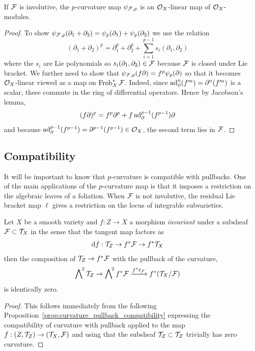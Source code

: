 \documentclass[main.tex]{subfiles}
\begin{document}
\begin{lemma}
If $\mathcal{F}$ is involutive, the $p$-curvature map $\psi_{\mathcal{F},p}$ is an $\mathcal{O}_X$-linear map of $\mathcal{O}_X$-modules.
\end{lemma}

\begin{proof}
To show $\psi_{\mathcal{F},p}(\partial_1 + \partial_2) = \psi_p(\partial_1) + \psi_p(\partial_2)$ we use the relation
\[ (\partial_1 + \partial_2)^p = \partial_1^p + \partial_2^p + \sum_{i = 1}^{p-1} s_i(\partial_1, \partial_2) \]
where the $s_i$ are Lie polynomials so $s_i(\partial_1, \partial_2) \in \mathcal{F}$ because $\mathcal{F}$ is closed under Lie bracket.
We further need to show that $\psi_{\mathcal{F},p}(f \partial) = f^p \psi_p(\partial)$ so that it becomes $\mathcal{O}_X$-linear viewed as a map on $\operatorname{\mathrm{Frob}}_X^* \mathcal{F}$. Indeed, since $\operatorname{\mathrm{ad}}_{\partial}^n(f^m) = \partial^n(f^m)$ is a scalar, these commute in the ring of differential operators. Hence by Jacobson's lemma,
\[ (f \partial)^p = f^p \partial^p + f \operatorname{\mathrm{ad}}_{\partial}^{p-1}(f^{p-1}) \partial \]
and because $\operatorname{\mathrm{ad}}_{\partial}^{p-1}(f^{p-1}) = \partial^{p-1}(f^{p-1}) \in \mathcal{O}_X$, the second term lies in $\mathcal{F}$.
\end{proof}

\subsection{Compatibility}

It will be important to know that $p$-curvature is compatible with pullbacks. One of the main applications of the $p$-curvature map is that it imposes a restriction on the algebraic leaves of a foliation. When $\mathcal{F}$ is not involutive, the residual Lie bracket map $\ell$ gives a restriction on the locus of integrable subvarieties.

\begin{prop}
Let $X$ be a smooth variety and $f : Z \to X$ a morphism \textit{invariant} under a subsheaf $\mathcal{F} \subset \mathcal{T}_X$ in the sense that the tangent map factors as
\[ \mathrm{d}{f} : \mathcal{T}_Z \to f^* \mathcal{F} \to f^* \mathcal{T}_X \]
then the composition of $\mathcal{T}_Z \to f^* \mathcal{F}$ with the pullback of the curvature,
\[ \bigwedge\nolimits^{\! 2} \mathcal{T}_Z \to \bigwedge\nolimits^{\! 2} f^* \mathcal{F} \xrightarrow{f^* \ell_{\mathcal{F}}} f^* (\mathcal{T}_X / \mathcal{F})  \]
is identically zero.  
\end{prop}

\begin{proof}
This follows immediately from the following Proposition~\ref{prop:curvature_pullback_compatibility} expressing the compatibility of curvature with pullback applied to the map $f : (Z, \mathcal{T}_Z) \to (\mathcal{T}_X, \mathcal{F})$ and using that the subsheaf $\mathcal{T}_Z \subset \mathcal{T}_Z$ trivially has zero curvature.
\end{proof}
\end{document}
